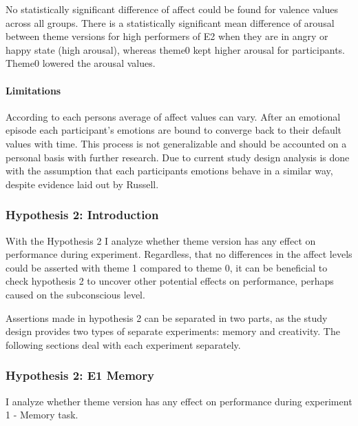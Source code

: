 	No statistically significant difference of affect could be found for valence values across all groups. There is a statistically significant mean difference of arousal between theme versions for high performers of E2 when they are in angry or happy state (high arousal), whereas theme0 kept higher arousal for participants. Theme0 lowered the arousal values.
	
	\paragraph{Limitations} According to \cite{Russell2003} each persons average of affect values can vary. After an emotional episode each participant's emotions are bound to converge back to their default values with time. This process is not generalizable and should be accounted on a personal basis with further research. Due to current study design analysis is done with the assumption that each participants emotions behave in a similar way, despite evidence laid out by Russell.
	

%	

	\subsubsection{Hypothesis 2: Introduction}

	With the Hypothesis 2 I analyze whether theme version has any effect on performance during experiment. Regardless, that no differences in the affect levels could be asserted with theme 1 compared to theme 0, it can be beneficial to check hypothesis 2 to uncover other potential effects on performance, perhaps caused on the subconscious level.
	
	Assertions made in hypothesis 2 can be separated in two parts, as the study design provides two types of separate experiments: memory and creativity. The following sections deal with each experiment separately.

	\subsubsection{Hypothesis 2: E1 Memory} \label{section:h2e1}
	
		I analyze whether theme version has any effect on performance during experiment 1 - Memory task.
		

